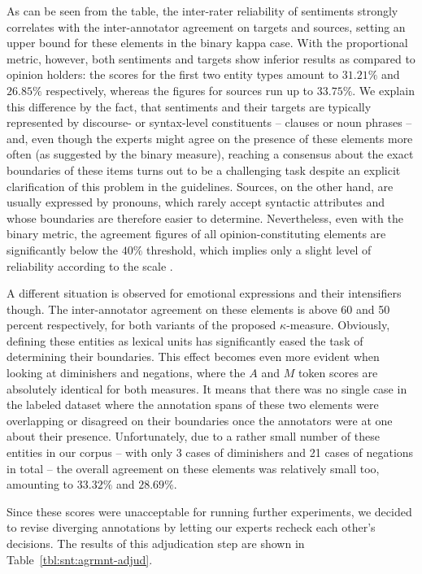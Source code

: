 As can be seen from the table, the inter-rater reliability of
sentiments strongly correlates with the inter-annotator agreement on
targets and sources, setting an upper bound for these elements in the
binary kappa case.  With the proportional metric, however, both
sentiments and targets show inferior results as compared to opinion
holders: the scores for the first two entity types amount to $31.21\%$
and $26.85\%$ respectively, whereas the figures for sources run up to
$33.75\%$.  We explain this difference by the fact, that sentiments
and their targets are typically represented by discourse- or
syntax-level constituents -- clauses or noun phrases -- and, even
though the experts might agree on the presence of these elements more
often (as suggested by the binary measure), reaching a consensus about
the exact boundaries of these items turns out to be a challenging task
despite an explicit clarification of this problem in the guidelines.
Sources, on the other hand, are usually expressed by pronouns, which
rarely accept syntactic attributes and whose boundaries are therefore
easier to determine.  Nevertheless, even with the binary metric, the
agreement figures of all opinion-constituting elements are
significantly below the $40\%$ threshold, which implies only a slight
level of reliability according to the \citeauthor{Landis:77} scale
\cite{Landis:77}.

A different situation is observed for emotional expressions and their
intensifiers though.  The inter-annotator agreement on these elements
is above 60 and 50 percent respectively, for both variants of the
proposed $\kappa$-measure.  Obviously, defining these entities as
lexical units has significantly eased the task of determining their
boundaries.  This effect becomes even more evident when looking at
diminishers and negations, where the $A$ and $M$ token scores are
absolutely identical for both measures.  It means that there was no
single case in the labeled dataset where the annotation spans of these
two elements were overlapping or disagreed on their boundaries once
the annotators were at one about their presence.  Unfortunately, due
to a rather small number of these entities in our corpus -- with only
3 cases of diminishers and 21 cases of negations in total -- the
overall agreement on these elements was relatively small too,
amounting to $33.32\%$ and $28.69\%$.

Since these scores were unacceptable for running further experiments,
we decided to revise diverging annotations by letting our experts
recheck each other's decisions.
The results of this adjudication step are shown in
Table~\ref{tbl:snt:agrmnt-adjud}.

